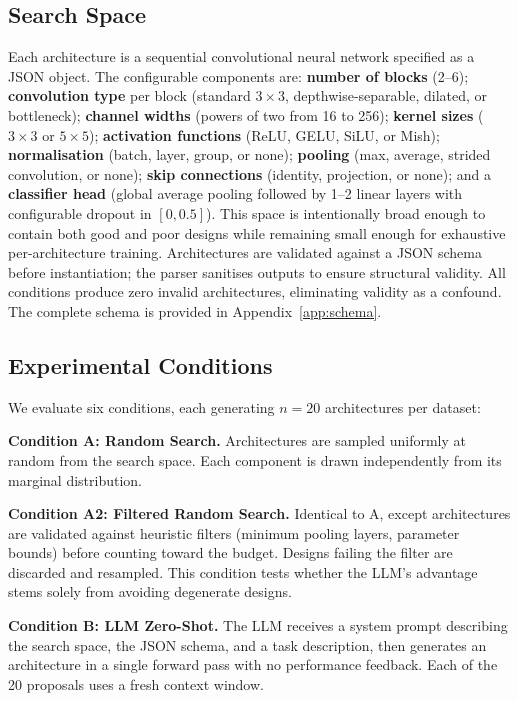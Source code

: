 \documentclass[10pt]{article}
\begin{document}
\subsection{Search Space}
\label{sec:searchspace}

Each architecture is a sequential convolutional neural network specified as a
JSON object.  The configurable components are: \textbf{number of blocks} (2--6);
\textbf{convolution type} per block (standard $3{\times}3$,
depthwise-separable, dilated, or bottleneck);
\textbf{channel widths} (powers of two from 16 to 256);
\textbf{kernel sizes} ($3{\times}3$ or $5{\times}5$);
\textbf{activation functions} (ReLU, GELU, SiLU, or Mish);
\textbf{normalisation} (batch, layer, group, or none);
\textbf{pooling} (max, average, strided convolution, or none);
\textbf{skip connections} (identity, projection, or none); and a
\textbf{classifier head} (global average pooling followed by 1--2 linear layers
with configurable dropout in $[0,0.5]$).  This space is intentionally broad
enough to contain both good and poor designs while remaining small enough for
exhaustive per-architecture training.  Architectures are validated against a JSON
schema before instantiation; the parser sanitises outputs to ensure structural
validity.  All conditions produce zero invalid architectures, eliminating
validity as a confound.  The complete schema is provided in
Appendix~\ref{app:schema}.

\subsection{Experimental Conditions}
\label{sec:conditions}

We evaluate six conditions, each generating $n{=}20$ architectures per dataset:

\textbf{Condition A: Random Search.}
Architectures are sampled uniformly at random from the search space.  Each
component is drawn independently from its marginal distribution.

\textbf{Condition A2: Filtered Random Search.}
Identical to A, except architectures are validated against heuristic filters
(minimum pooling layers, parameter bounds) before counting toward the budget.
Designs failing the filter are discarded and resampled.  This condition tests
whether the LLM's advantage stems solely from avoiding degenerate designs.

\textbf{Condition B: LLM Zero-Shot.}
The LLM receives a system prompt describing the search space, the JSON schema,
and a task description, then generates an architecture in a single forward pass
with no performance feedback.  Each of the 20 proposals uses a fresh context
window.
\end{document}
